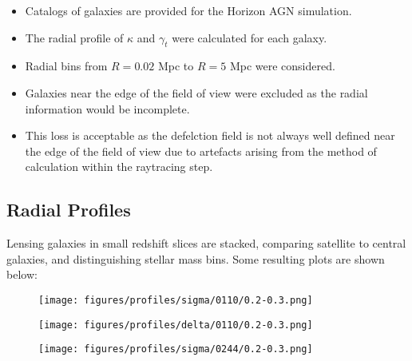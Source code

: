 \documentclass{beamer}
\begin{document}
  \begin{frame}
    \begin{itemize}
      \item Catalogs of galaxies are provided for the Horizon AGN simulation.
      \item The radial profile of $\kappa$ and $\gamma_t$ were calculated for each galaxy.
      \item Radial bins from $R = 0.02$ Mpc to $R = 5$ Mpc were considered.
      \item Galaxies near the edge of the field of view were excluded as the radial information would be incomplete.
      \item This loss is acceptable as the defelction field is not always well defined near the edge of the field of view due to artefacts arising from the method of calculation within the raytracing step.
    \end{itemize}
  \end{frame}

  \subsection{Radial Profiles}

  \begin{frame}
    Lensing galaxies in small redshift slices are stacked, comparing satellite to central galaxies, and distinguishing stellar mass bins. Some resulting plots are shown below:
  \end{frame}

  \begin{frame}
    \begin{figure}[H]
      \centering
      \texttt{[image: figures/profiles/sigma/0110/0.2-0.3.png]}
    \end{figure}
  \end{frame}

  \begin{frame}
    \begin{figure}[H]
      \centering
      \texttt{[image: figures/profiles/delta/0110/0.2-0.3.png]}
    \end{figure}
  \end{frame}

  \begin{frame}
    \begin{figure}[H]
      \centering
      \texttt{[image: figures/profiles/sigma/0244/0.2-0.3.png]}
    \end{figure}
  \end{frame}
\end{document}
